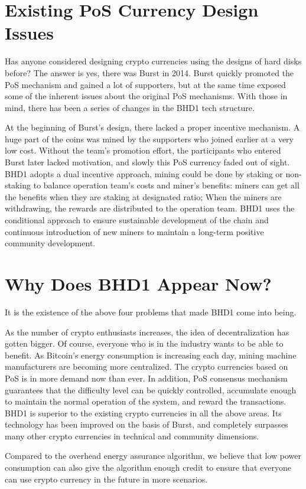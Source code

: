 \section{Existing PoS Currency Design Issues}
\begin{flushleft}
    Has anyone considered designing crypto currencies using the designs of hard disks before? The answer is yes, there was Burst in 2014. Burst quickly promoted the PoS mechanism and gained a lot of supporters, but at the same time exposed some of the inherent issues about the original PoS mechanisms. With those in mind, there has been a series of changes in the BHD1 tech structure.
\end{flushleft}
\begin{flushleft}
    At the beginning of Burst's design, there lacked a proper incentive mechanism. A huge part of the coins was mined by the supporters who joined earlier at a very low cost. Without the team's promotion effort, the participants who entered Burst later lacked motivation, and slowly this PoS currency faded out of sight. BHD1 adopts a dual incentive approach, mining could be done by staking or non-staking to balance operation team's costs and miner's benefits: miners can get all the benefits when they are staking at designated ratio; When the miners are withdrawing, the rewards are distributed to the operation team. BHD1 uses the conditional approach to ensure sustainable development of the chain and continuous introduction of new miners to maintain a long-term positive community development.
\end{flushleft}
\section{Why Does BHD1 Appear Now?}
\begin{flushleft}
    It is the existence of the above four problems that made BHD1 come into being.
\end{flushleft}
\begin{flushleft}
    As the number of crypto enthusiasts increases, the idea of decentralization has gotten bigger. Of course, everyone who is in the industry wants to be able to benefit. As Bitcoin's energy consumption is increasing each day, mining machine manufacturers are becoming more centralized. The crypto currencies based on PoS is in more demand now than ever. In addition, PoS consensus mechanism guarantees that the difficulty level can be quickly controlled, accumulate enough to maintain the normal operation of the system, and reward the transactions. BHD1 is superior to the existing crypto currencies in all the above areas. Its technology has been improved on the basis of Burst, and completely surpasses many other crypto currencies in technical and community dimensions.
\end{flushleft}
\begin{flushleft}
    Compared to the overhead energy assurance algorithm, we believe that low power consumption can also give the algorithm enough credit to ensure that everyone can use crypto currency in the future in more scenarios.
\end{flushleft}

